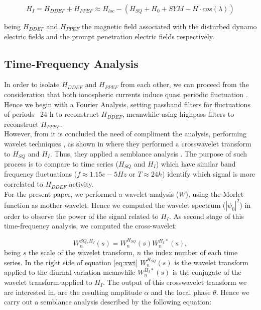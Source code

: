 \documentclass[a4paper]{article}
\theoremstyle{plain}
\theoremstyle{definition}
\begin{document}
	\begin{equation}
		H_I = H_{DDEF} + H_{PPEF} \approx H_{loc} - (H_{SQ} + H_0 + SYM-H \cdot cos(\lambda))
	\end{equation}
	
	\noindent being $H_{DDEF}$ and $H_{PPEF}$ the magnetic field associated with the disturbed dynamo electric fields and the prompt penetration electric fields respectively.\\
	
	
	\subsection{Time-Frequency Analysis}
	In order to isolate $H_{DDEF}$ and $H_{PPEF}$ from each other, we can proceed from the consideration that both ionospheric currents induce quasi periodic fluctuation \cite{nishida_68_fluctuations, blanc_ddyn, amory2020_filtros}. Hence we begin with a Fourier Analysis, setting passband filters for fluctuations of periods ~24 h to reconstruct $H_{DDEF}$, meanwhile using highpass filters to reconstruct $H_{PPEF}$.\\
	
	However, from \cite{CASTELLANOSVELAZCO2024} it is concluded the need of compliment the analysis, performing wavelet techniques \cite{APracticalGuidetoWaveletAnalysis}, as shown in \cite{amory_younas2021} where they performed a crosswavelet transform to $H_{SQ}$ and $H_I$. Thus, they applied a semblance analysis \cite{cooper_semblance}. The purpose of such process is to compare to time series ($H_{SQ}$ and $H_I$) which have similar band frequency fluctuations ($f \approx 1.15e-5 Hz$ or $T \approx 24 h$) identify which signal is more correlated to $H_{DDEF}$ activity.\\
	
	
	For the present paper, we performed a wavelet analysis ($W$), using the Morlet function as mother wavelet. Hence we computed the wavelet spectrum ($|\psi_0|^2$) in order to observe the power of the signal related to $H_I$. As second stage of this time-frequency analysis, we computed the cross-wavelet:
	
	\begin{equation}
		\label{eq:xwt}
		W_n^{SQ,H_I}(s) = W_n^{H_{SQ}}(s) W_n^{H_I *}(s),
	\end{equation}
	\noindent being $s$ the scale of the wavelet transform, $n$ the index number of each time series. In the right side of equation \ref{eq:xwt} $W_n^{H_{SQ}}(s)$ is the wavelet transform applied to the diurnal variation meanwhile $ W_n^{H_I *}(s)$ is the conjugate of the wavelet transform applied to $H_I$. The output of this crosswavelet transform we are interested in, are the resulting amplitude $\alpha$ and the local phase $\theta$. Hence we carry out a semblance analysis described by the following equation:
	
\end{document}

